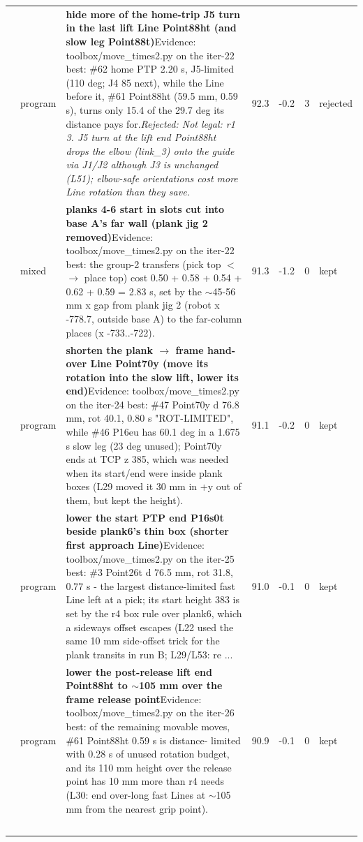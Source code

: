 {\begin{longtable}{>{\raggedleft}p{5mm} p{12mm} >{\raggedright}p{85mm} r r r p{14mm}}
23 & program & \textbf{hide more of the home-trip J5 turn in the last lift Line Point88ht (and slow leg Point88t)}\newline Evidence: toolbox/move\_times2.py on the iter-22 best: \#62 home PTP 2.20 s, J5-limited (110 deg; J4 85 next), while the Line before it, \#61 Point88ht (59.5 mm, 0.59 s), turns only 15.4 of the 29.7 deg its distance pays for.\newline \textit{Rejected: Not legal: r1 3. J5 turn at the lift end Point88ht drops the elbow (link\_3) onto the guide via J1/J2 although J3 is unchanged (L51); elbow-safe orientations cost more Line rotation than they save.} & 92.3 & -0.2 & 3 & rejected \\
24 & mixed & \textbf{planks 4-6 start in slots cut into base A's far wall (plank jig 2 removed)}\newline Evidence: toolbox/move\_times2.py on the iter-22 best: the group-2 transfers (pick top $<$$\to$ place top) cost 0.50 + 0.58 + 0.54 + 0.62 + 0.59 = 2.83 s, set by the $\sim$45-56 mm x gap from plank jig 2 (robot x -778.7, outside base A) to the far-column places (x -733..-722). & 91.3 & -1.2 & 0 & kept \\
25 & program & \textbf{shorten the plank $\to$ frame hand-over Line Point70y (move its rotation into the slow lift, lower its end)}\newline Evidence: toolbox/move\_times2.py on the iter-24 best: \#47 Point70y d 76.8 mm, rot 40.1, 0.80 s "ROT-LIMITED", while \#46 P16eu has 60.1 deg in a 1.675 s slow leg (23 deg unused); Point70y ends at TCP z 385, which was needed when its start/end were inside plank boxes (L29 moved it 30 mm in +y out of them, but kept the height). & 91.1 & -0.2 & 0 & kept \\
26 & program & \textbf{lower the start PTP end P16s0t beside plank6's thin box (shorter first approach Line)}\newline Evidence: toolbox/move\_times2.py on the iter-25 best: \#3 Point26t d 76.5 mm, rot 31.8, 0.77 s - the largest distance-limited fast Line left at a pick; its start height 383 is set by the r4 box rule over plank6, which a sideways offset escapes (L22 used the same 10 mm side-offset trick for the plank transits in run B; L29/L53: re ... & 91.0 & -0.1 & 0 & kept \\
27 & program & \textbf{lower the post-release lift end Point88ht to $\sim$105 mm over the frame release point}\newline Evidence: toolbox/move\_times2.py on the iter-26 best: of the remaining movable moves, \#61 Point88ht 0.59 s is distance- limited with 0.28 s of unused rotation budget, and its 110 mm height over the release point has 10 mm more than r4 needs (L30: end over-long fast Lines at $\sim$105 mm from the nearest grip point). & 90.9 & -0.1 & 0 & kept \\
$$
\end{longtable}}
